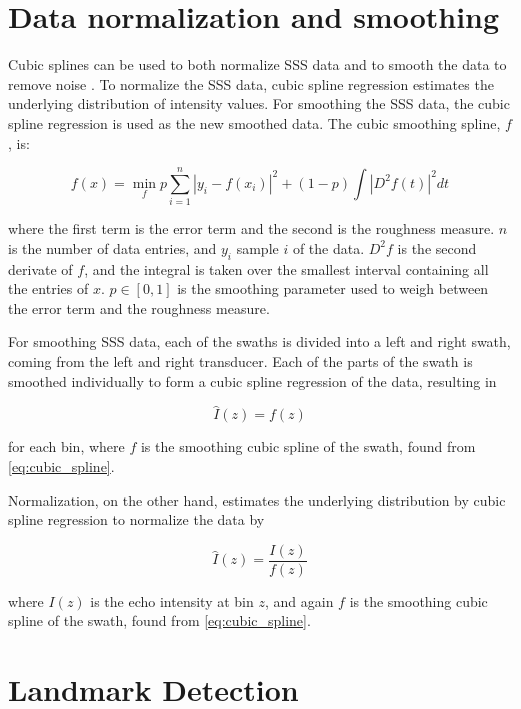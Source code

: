 \section{Data normalization and smoothing}

Cubic splines can be used to both normalize SSS data \cite{ReitanHogstad2022Side-ScanAutonomy} and to smooth the data to remove noise \cite{Al-Rawi2017LandmarkImages}. To normalize the SSS data, cubic spline regression estimates the underlying distribution of intensity values. For smoothing the SSS data, the cubic spline regression is used as the new smoothed data. The cubic smoothing spline, $f$, is: 

\begin{equation}
    {f}(x) = \min_{f} p \sum_{i=1}^n |y_i-f(x_i)|^2 + (1-p) \int|D^2f(t)|^2dt
    \label{eq:cubic_spline}
\end{equation}

where the first term is the error term and the second is the roughness measure. $n$ is the number of data entries, and $y_i$ sample $i$ of the data. $D^2f$ is the second derivate of $f$, and the integral is taken over the smallest interval containing all the entries of $x$. $p \in [0,1]$ is the smoothing parameter used to weigh between the error term and the roughness measure. 

For smoothing SSS data, each of the swaths is divided into a left and right swath,  coming from the left and right transducer. Each of the parts of the swath is smoothed individually to form a cubic spline regression of the data, resulting in

\begin{equation}
    \hat{I}(z) = f(z)
    \label{eq:swath_smoothing}
\end{equation}

for each bin, where $f$ is the smoothing cubic spline of the swath, found from \cref{eq:cubic_spline}.

Normalization, on the other hand, estimates the underlying distribution by cubic spline regression to normalize the data by

\begin{equation}
    \hat{I}(z) = \frac{I(z)}{f(z)}
    \label{eq:swath_norm}
\end{equation}

where $I(z)$ is the echo intensity at bin $z$, and again $f$ is the smoothing cubic spline of the swath, found from \cref{eq:cubic_spline}.

\section{Landmark Detection}

